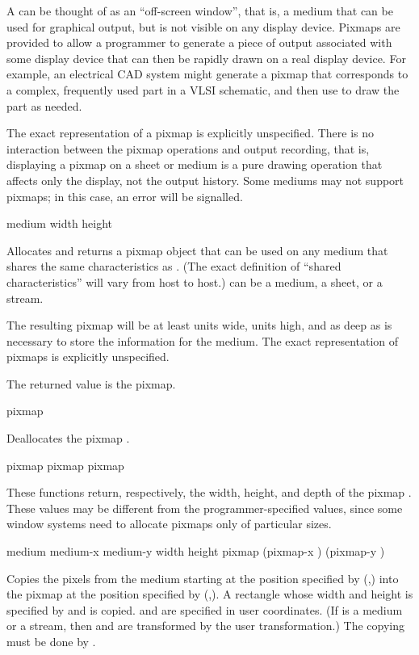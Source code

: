 A  can be thought of as an ``off-screen window'', that is, a
medium that can be used for graphical output, but is not visible on any display
device.   Pixmaps are provided to allow a programmer to generate a piece of
output associated with some display device that can then be rapidly drawn on a
real display device.  For example, an electrical CAD system might generate a
pixmap that corresponds to a complex, frequently used part in a VLSI schematic,
and then use  to draw the part as needed.

The exact representation of a pixmap is explicitly unspecified.  There
is no interaction between the pixmap operations and output recording,
that is, displaying a pixmap on a sheet or medium is a pure drawing
operation that affects only the display, not the output history.  Some
mediums may not support pixmaps; in this case, an error will be
signalled.


 {medium width height}

Allocates and returns a pixmap object that can be used on any medium that shares
the same characteristics as .  (The exact definition of ``shared
characteristics'' will vary from host to host.)   can be a medium, a
sheet, or a stream.

The resulting pixmap will be at least  units wide,  units
high, and as deep as is necessary to store the information for the medium.  The
exact representation of pixmaps is explicitly unspecified.

The returned value is the pixmap.

 {pixmap}

Deallocates the pixmap .


  {pixmap}
 {pixmap}
  {pixmap}

These functions return, respectively, the width, height, and depth of the pixmap
.  These values may be different from the programmer-specified
values, since some window systems need to allocate pixmaps only of particular
sizes.


 {medium medium-x medium-y width height
                         \optional pixmap (pixmap-x ) (pixmap-y )}

Copies the pixels from the medium  starting at the position specified
by (,) into the pixmap  at the position
specified by (,).  A rectangle whose width and
height is specified by  and  is copied.  
and  are specified in user coordinates.  (If  is a
medium or a stream, then  and  are transformed by the
user transformation.)  The copying must be done by .

